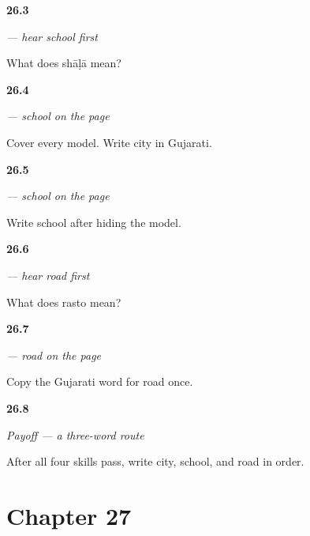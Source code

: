 \noindent\begin{minipage}[t]{\linewidth}
\raggedright
\hypertarget{review-GU-C22-hear-shaalaa-recall}{\textbf{26.3}} \emph{ — hear school first}\par
\small What does shāḷā mean?
\end{minipage}\par\medskip

\noindent\begin{minipage}[t]{\linewidth}
\raggedright
\hypertarget{review-GU-C22-shaalaa-city-r1}{\textbf{26.4}} \emph{ — school on the page}\par
\small Cover every model. Write city in Gujarati.
\end{minipage}\par\medskip

\noindent\begin{minipage}[t]{\linewidth}
\raggedright
\hypertarget{review-GU-C22-shaalaa-delayed}{\textbf{26.5}} \emph{ — school on the page}\par
\small Write school after hiding the model.
\end{minipage}\par\medskip

\noindent\begin{minipage}[t]{\linewidth}
\raggedright
\hypertarget{review-GU-C22-hear-rasto-recall}{\textbf{26.6}} \emph{ — hear road first}\par
\small What does rasto mean?
\end{minipage}\par\medskip

\noindent\begin{minipage}[t]{\linewidth}
\raggedright
\hypertarget{review-GU-C22-rasto-copy}{\textbf{26.7}} \emph{ — road on the page}\par
\small Copy the Gujarati word for road once.
\end{minipage}\par\medskip

\noindent\begin{minipage}[t]{\linewidth}
\raggedright
\hypertarget{review-GU-C22-route-three-payoff}{\textbf{26.8}} \emph{Payoff — a three-word route}\par
\small After all four skills pass, write city, school, and road in order.
\end{minipage}\par\medskip

\section*{Chapter 27}

